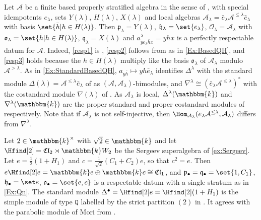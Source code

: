\documentclass[a4paper,11pt]{amsart}
\numberwithin{equation}{subsection}
\theoremstyle{definition}
\theoremstyle{theorem}
\theoremstyle{remark}
\newcommand\CA{\mathcal{A}}
\newcommand\CO{\mathcal{O}}
\newcommand\plam[1][\lambda]{\mathfrak{p}_{#1}}
\newcommand\hlam[1][\lambda]{\mathfrak{h}_{#1}}
\newcommand\qlam[1][\lambda]{\mathfrak{q}_{#1}}
\newcommand\Olam[1][\lambda]{\CO_{#1}}
\newcommand\olam[1][\lambda]{\mathfrak{o}_{#1}}
\newcommand\Sym{W}
\newcommand\kk{\mathbbm{k}}
\begin{document}
\begin{Example}\label{Ex:ProperlyStratified}
  Let $\CA$ be a finite based properly stratified algebra in the sense of
  \cite[Definition~5.21]{BrundanStroppel:Semiinfinite}, with special idempotents $e_\lambda$, sets
  $Y(\lambda)$, $H(\lambda)$, $X(\lambda)$ and local algebras
  $\CA_\lambda=\bar e_\lambda\CA^{\le\lambda}\bar e_\lambda$ with basis $\set{\bar h|h\in H(\lambda)}$.
  Then $\plam=Y(\lambda)$, $\hlam=\set{e_\lambda}$, $\Olam=\CA_\lambda$ with
  $\olam=\set{\bar h|h\in H(\lambda)}$, $\qlam=X(\lambda)$ and $a^\lambda_{ye_\lambda\bar hx}=yhx$ is a
  perfectly respectable datum for $\CA$. Indeed, \autoref{resp1} is
  \cite[(PS4)]{BrundanStroppel:Semiinfinite}, \autoref{resp2} follows from
  \cite[(PS5)]{BrundanStroppel:Semiinfinite} as in \autoref{Ex:BasedQH}, and \autoref{resp3} holds because  the $h\in H(\lambda)$ multiply like the basis $\olam$ of $\CA_\lambda$ modulo $\CA^{>\lambda}$.
  As in \autoref{Ex:StandardBasedQH}, $a_{y\bar h}\mapsto yh\bar e_\lambda$ identifies
  $\Delta^\lambda$ with the standard module $\Delta(\lambda)=\CA^{\le\lambda}\bar e_\lambda$ of
  \cite[(5.6)]{BrundanStroppel:Semiinfinite} as $(\CA,\CA_\lambda)$-bimodules, and
  $\nabla^\lambda\cong(\bar e_\lambda\CA^{\le\lambda})^*$ with the costandard module $\nabla(\lambda)$ of \cite[(5.7)]{BrundanStroppel:Semiinfinite}. As
  $\CA_\lambda$ is local, $\Delta^\lambda(\kk)$ and $\nabla^\lambda(\kk)$ are the
  proper standard and proper costandard modules of \cite[\S5.3]{BrundanStroppel:Semiinfinite} respectively. Note that if
  $\CA_\lambda$ is not self-injective, then
  $\Hom_{\CA_\lambda}(\bar e_\lambda\CA^{\le\lambda},\CA_\lambda)$ differs from $\nabla^\lambda$.
\end{Example}

\begin{Example}\label{Ex:SergeevTwo}
  Let $2\in\kk^\times$ with $\sqrt2\in\kk$ and let $\Hfind[2]=\mathfrak{Cl}_2\rtimes\kk\Sym_2$ be the Sergeev
  superalgebra of \autoref{ex:Sergeev}. Let $e=\tfrac12(1+H_1)$ and $c=\tfrac1{\sqrt2}(C_1+C_2)e$, so that $c^2=e$. Then
  $e\Hfind[2]e=\kk e\oplus\kk c\cong\mathfrak{Cl}_1$, and $\plam[\bullet]=\qlam[\bullet]=\set{1,C_1}$,
  $\hlam[\bullet]=\set e$, $\olam[\bullet]=\set{e,c}$ is a respectable datum with a
  single stratum as in \autoref{Ex:Qn}. The standard module $\Delta^\bullet=\Hfind[2]e=\Hfind[2](1+H_1)$ is the
  simple module of type $\mathtt Q$ labelled by the strict partition $(2)$ in \cite{Sergeev}. It agrees with the parabolic module of  Mori from \cite[\S6]{Mori}.
\end{Example}
\end{document}
